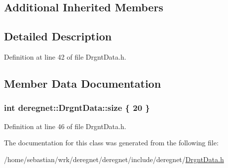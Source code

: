 \subsection*{Additional Inherited Members}


\subsection{Detailed Description}


Definition at line 42 of file Drgnt\+Data.\+h.



\subsection{Member Data Documentation}
\subsubsection[{\texorpdfstring{size}{size}}]{\setlength{\rightskip}{0pt plus 5cm}int deregnet\+::\+Drgnt\+Data\+::size \{ 20 \}}\hypertarget{classderegnet_1_1DrgntData_ae921ab4e0b12be7f488cfd4db2b1623c}{}\label{classderegnet_1_1DrgntData_ae921ab4e0b12be7f488cfd4db2b1623c}


Definition at line 46 of file Drgnt\+Data.\+h.



The documentation for this class was generated from the following file\+:\begin{DoxyCompactItemize}
\item 
/home/sebastian/wrk/deregnet/deregnet/include/deregnet/\hyperlink{DrgntData_8h}{Drgnt\+Data.\+h}\end{DoxyCompactItemize}
